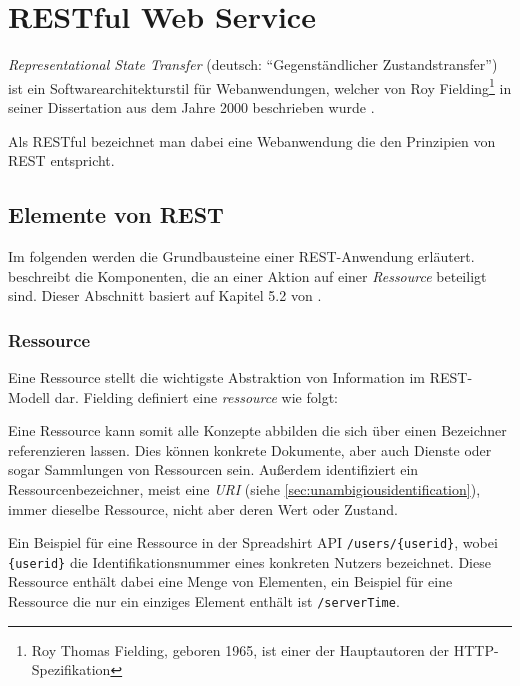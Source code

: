 \section{RESTful Web Service}
\label{sec:rest}

\emph{Representational State Transfer} (deutsch: \enquote{Gegenständlicher Zustandstransfer}) ist ein Softwarearchitekturstil für Webanwendungen, welcher von Roy Fielding\footnote{Roy Thomas Fielding, geboren 1965, ist einer der Hauptautoren der HTTP-Spezifikation} in seiner Dissertation aus dem Jahre 2000  beschrieben wurde \cite[Kapitel 5][95 ff.]{fieldingDissertation}. 

Als \gls{RESTful} bezeichnet man dabei eine Webanwendung die den Prinzipien von \gls{REST} entspricht. 

\subsection{Elemente von REST}

Im folgenden werden die Grundbausteine einer REST-Anwendung erläutert.  beschreibt die Komponenten, die an einer Aktion auf einer \emph{Ressource} beteiligt sind. Dieser Abschnitt basiert auf Kapitel 5.2 von \cite[][S. 86 ff.]{fieldingDissertation}.

\subsubsection{Ressource}

Eine Ressource stellt die wichtigste Abstraktion von Information im REST-Modell dar. Fielding definiert eine \emph{ressource} wie folgt:


Eine Ressource kann somit alle Konzepte abbilden die sich über einen Bezeichner referenzieren lassen. Dies können konkrete Dokumente, aber auch Dienste oder sogar Sammlungen von Ressourcen sein.
Außerdem identifiziert ein Ressourcenbezeichner, meist eine \emph{URI} (siehe \cref{sec:unambigiousidentification}), immer dieselbe Ressource, nicht aber deren Wert oder Zustand.

Ein Beispiel für eine Ressource in der Spreadshirt API \texttt{/users/\{userid\}}, wobei \texttt{\{userid\}} die Identifikationsnummer eines konkreten Nutzers bezeichnet. Diese Ressource enthält dabei eine Menge von Elementen, ein Beispiel für eine Ressource die nur ein einziges Element enthält ist \texttt{/serverTime}. 

